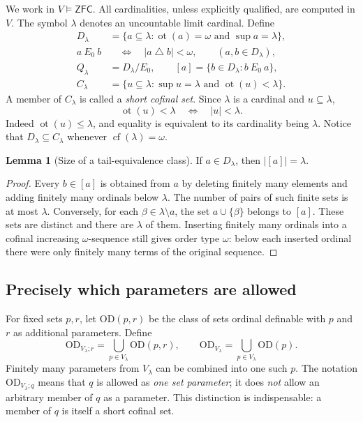 \documentclass[11pt,letterpaper]{article}
\theoremstyle{definition}
\newtheorem{lemma}[definition]{Lemma}
\numberwithin{equation}{section}
\newcommand{\ZFC}{\mathsf{ZFC}}
\newcommand{\OD}{\mathrm{OD}}
\newcommand{\cf}{\operatorname{cf}}
\newcommand{\ot}{\operatorname{ot}}
\newcommand{\D}{D_\lambda}
\newcommand{\Q}{Q_\lambda}
\newcommand{\C}{C_\lambda}
\newcommand{\ODlow}{\OD_{V_\lambda}}
\newcommand{\ODq}{\OD_{V_\lambda;q}}
\begin{document}
We work in $V\models\ZFC$. All cardinalities, unless explicitly qualified, are computed in $V$. The symbol $\lambda$ denotes an uncountable limit cardinal. Define
\begin{align}
\D&=\{a\subseteq\lambda:\ot(a)=\omega\text{ and }\sup a=\lambda\},\label{eq:D}\\
a\ E_0\ b&\quad\Longleftrightarrow\quad |a\mathbin{\triangle}b|<\omega,\qquad(a,b\in\D),\label{eq:E}\\
\Q&=\D/E_0,\qquad [a]=\{b\in\D:b\ E_0\ a\},\label{eq:Q}\\
\C&=\{u\subseteq\lambda:\sup u=\lambda\text{ and }\ot(u)<\lambda\}.\label{eq:C}
\end{align}
A member of $\C$ is called a \emph{short cofinal set}. Since $\lambda$ is a cardinal and $u\subseteq\lambda$,
\begin{equation}
\ot(u)<\lambda\quad\Longleftrightarrow\quad |u|<\lambda.
\label{eq:short}
\end{equation}
Indeed $\ot(u)\le\lambda$, and equality is equivalent to its cardinality being $\lambda$. Notice that $\D\subseteq\C$ whenever $\cf(\lambda)=\omega$.

\begin{lemma}[Size of a tail-equivalence class]\label{lem:classsize}
If $a\in\D$, then $|[a]|=\lambda$.
\end{lemma}
\begin{proof}
Every $b\in[a]$ is obtained from $a$ by deleting finitely many elements and adding finitely many ordinals below $\lambda$. The number of pairs of such finite sets is at most $\lambda$. Conversely, for each $\beta\in\lambda\setminus a$, the set $a\cup\{\beta\}$ belongs to $[a]$. These sets are distinct and there are $\lambda$ of them. Inserting finitely many ordinals into a cofinal increasing $\omega$-sequence still gives order type $\omega$: below each inserted ordinal there were only finitely many terms of the original sequence.
\end{proof}

\subsection{Precisely which parameters are allowed}

For fixed sets $p,r$, let $\OD(p,r)$ be the class of sets ordinal definable with $p$ and $r$ as additional parameters. Define
\begin{equation}
\OD_{V_\lambda;r}=\bigcup_{p\in V_\lambda}\OD(p,r),
\qquad
\ODlow=\bigcup_{p\in V_\lambda}\OD(p).
\label{eq:OD}
\end{equation}
Finitely many parameters from $V_\lambda$ can be combined into one such $p$. The notation $\ODq$ means that $q$ is allowed as \emph{one set parameter}; it does \emph{not} allow an arbitrary member of $q$ as a parameter. This distinction is indispensable: a member of $q$ is itself a short cofinal set.
\end{document}
